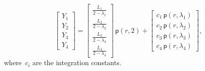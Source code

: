 \documentclass[preprint,10pt,times]{elsarticle}
\numberwithin{equation}{section}
\newcommand{\pr}[1]{\left( #1 \right)}
\newcommand{\p}{\,\mathsf{p}}
\renewcommand{\>}{$\Rightarrow$}
\begin{document}
\begin{equation}
	\begin{bmatrix}
	 Y_{1} \\ Y_{2} \\ Y_{3} \\ Y_{4}
	\end{bmatrix}
	=
	\begin{bmatrix}
	 \frac{L_{1}}{2-\lambda_{1}} \\ \frac{L_{2}}{2-\lambda_{2}} \\ \frac{L_{3}}{2-\lambda_{3}} \\ \frac{L_{4}}{2-\lambda_{4}}
	\end{bmatrix}\p\pr{r,2}
	+
	\begin{bmatrix}
	 c_{1} \p\pr{r,\lambda_{1}} \\ c_{2} \p\pr{r,\lambda_{2}} \\ c_{3} \p\pr{r,\lambda_{3}} \\ c_{4} \p\pr{r,\lambda_{4}}
	\end{bmatrix},
\end{equation}
where~$c_{i}$ are the integration constants.
\end{document}
